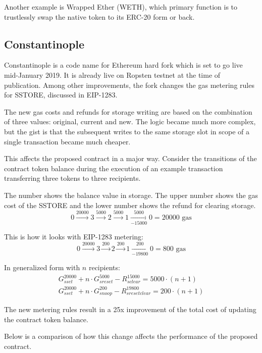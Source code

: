 \documentclass[12pt]{article}
\begin{document}
Another example is Wrapped Ether (WETH), which primary function is to trustlessly swap the native token to its ERC-20 form or back.

\subsection{Constantinople}

Constantinople is a code name for Ethereum hard fork which is set to go live mid-January 2019.
It is already live on Ropsten testnet at the time of publication.
Among other improvements, the fork changes the gas metering rules for SSTORE,
discussed in EIP-1283\cite{eip1283}.

The new gas costs and refunds for storage writing are based on the combination of three values: original, current and new.
The logic became much more complex, but the gist is that the subsequent writes to the same storage slot in scope of a single transaction became much cheaper.

This affects the proposed contract in a major way.
Consider the transitions of the contract token balance during the execution of an example transaction transferring three tokens to three recipients.

The number shows the balance value in storage. The upper number shows the gas cost of the SSTORE and the lower number shows the refund for clearing storage.
\begin{equation}
0 \xrightarrow{20000} 3 \xrightarrow{5000} 2 \xrightarrow{5000} 1 \xrightarrow[-15000]{5000} 0 = 20000 \text{ gas}	
\end{equation}

This is how it looks with EIP-1283 metering:
\begin{equation}
0 \xrightarrow{20000} 3 \xrightarrow{200} 2 \xrightarrow{200} 1 \xrightarrow[-19800]{200} 0 = 800 \text{ gas}	
\end{equation}

In generalized form with $n$ recipients:
\begin{gather}
G_{sset}^{20000} + n \cdot G_{sreset}^{5000} - R_{sclear}^{15000} = 5000 \cdot (n + 1) \\
G_{sset}^{20000} + n \cdot G_{snoop}^{200} - R_{sresetclear}^{19800} = 200 \cdot (n + 1)
\end{gather}

The new metering rules result in a 25x improvement of the total cost of updating the contract token balance.

Below is a comparison of how this change affects the performance of the proposed contract.
\end{document}

